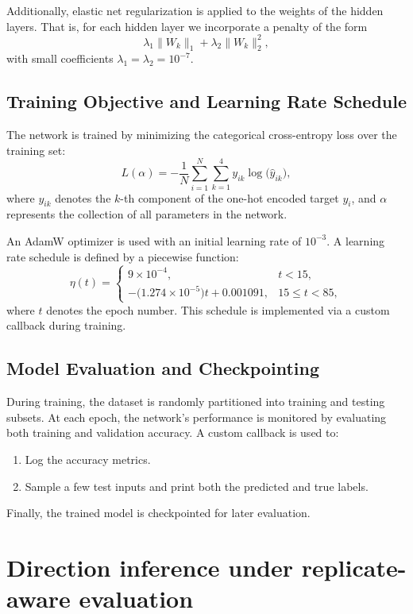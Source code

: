 \documentclass[11pt]{article}
\theoremstyle{plain}
\theoremstyle{definition}
\theoremstyle{remark}
\begin{document}
Additionally, elastic net regularization is applied to the weights of the hidden layers. That is, for each hidden layer we incorporate a penalty of the form
\[
\lambda_1 \|W_k\|_1 + \lambda_2 \|W_k\|_2^2,
\]
with small coefficients \(\lambda_1 = \lambda_2 = 10^{-7}\).

\subsection{Training Objective and Learning Rate Schedule}

The network is trained by minimizing the categorical cross-entropy loss over the training set:
\[
L(\alpha) = -\frac{1}{N}\sum_{i=1}^{N} \sum_{k=1}^{4} y_{ik}\log\bigl(\hat{y}_{ik}\bigr),
\]
where \(y_{ik}\) denotes the \(k\)-th component of the one-hot encoded target \(y_i\), and \(\alpha\) represents the collection of all parameters in the network.

An AdamW optimizer is used with an initial learning rate of \(10^{-3}\). A learning rate schedule is defined by a piecewise function:
\[
\eta(t)=
\begin{cases}
9\times 10^{-4}, & t < 15, \\[1mm]
-\bigl(1.274\times 10^{-5}\bigr) t + 0.001091, & 15 \le t < 85,
\end{cases}
\]
where \(t\) denotes the epoch number. This schedule is implemented via a custom callback during training.

\subsection{Model Evaluation and Checkpointing}

During training, the dataset is randomly partitioned into training and testing subsets. At each epoch, the network's performance is monitored by evaluating both training and validation accuracy. A custom callback is used to:
\begin{enumerate}
    \item Log the accuracy metrics.
    \item Sample a few test inputs and print both the predicted and true labels.
\end{enumerate}

Finally, the trained model is checkpointed for later evaluation.

\section{Direction inference under replicate-aware evaluation}
\label{sec:leakage-aware-reanalysis}
\end{document}
